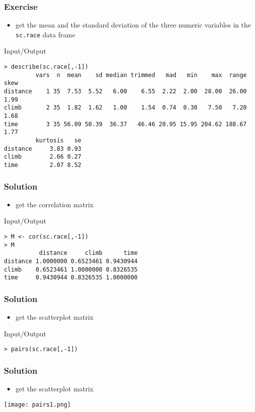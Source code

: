 \begin{frame}[fragile]\frametitle{Exercise}
  \begin{itemize}
  \item get the mean and the standard deviation of the three numeric variables in the \texttt{sc.race} data frame
  \end{itemize}
  \begin{exampleblock}{Input/Output}\tiny
\begin{verbatim}
> describe(sc.race[,-1])
         vars  n  mean    sd median trimmed   mad   min    max  range skew
distance    1 35  7.53  5.52   6.00    6.55  2.22  2.00  28.00  26.00 1.99
climb       2 35  1.82  1.62   1.00    1.54  0.74  0.30   7.50   7.20 1.68
time        3 35 56.09 50.39  36.37   46.46 20.95 15.95 204.62 188.67 1.77
         kurtosis   se
distance     3.83 0.93
climb        2.66 0.27
time         2.07 8.52
\end{verbatim}
  \end{exampleblock}
\end{frame}


\begin{frame}[fragile]\frametitle{Solution}
  \begin{itemize}
  \item get the correlation matrix
  \end{itemize}
  \begin{exampleblock}{Input/Output}\small
\begin{verbatim}
> M <- cor(sc.race[,-1])
> M
          distance     climb      time
distance 1.0000000 0.6523461 0.9430944
climb    0.6523461 1.0000000 0.8326535
time     0.9430944 0.8326535 1.0000000
\end{verbatim}
  \end{exampleblock}
\end{frame}


\begin{frame}[fragile]\frametitle{Solution}
  \begin{itemize}
  \item get the scatterplot matrix
  \end{itemize}
  \begin{exampleblock}{Input/Output}\small
\begin{verbatim}
> pairs(sc.race[,-1])
\end{verbatim}
  \end{exampleblock}
\end{frame}

\begin{frame}[fragile]\frametitle{Solution}
  \begin{itemize}
  \item get the scatterplot matrix
  \end{itemize}
\begin{center}
\texttt{[image: pairs1.png]}
\end{center}
\end{frame}




